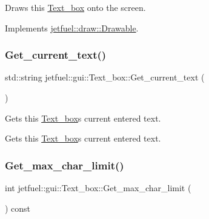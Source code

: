 Draws this \hyperlink{classjetfuel_1_1gui_1_1Text__box}{Text\+\_\+box} onto the screen. 

Implements \hyperlink{classjetfuel_1_1draw_1_1Drawable_a1a072070322965ce9411ee6e7c311c56}{jetfuel\+::draw\+::\+Drawable}.

\mbox{\label{classjetfuel_1_1gui_1_1Text__box_ac68da2c696932b9ac32fb8f463239079}} 
\subsubsection{\texorpdfstring{Get\+\_\+current\+\_\+text()}{Get\_current\_text()}}
{\footnotesize\ttfamily std\+::string jetfuel\+::gui\+::\+Text\+\_\+box\+::\+Get\+\_\+current\+\_\+text (\begin{DoxyParamCaption}{ }\end{DoxyParamCaption})\hspace{0.3cm}{\ttfamily [inline]}}



Gets this \hyperlink{classjetfuel_1_1gui_1_1Text__box}{Text\+\_\+box}\textquotesingle{}s current entered text. 

Gets this \hyperlink{classjetfuel_1_1gui_1_1Text__box}{Text\+\_\+box}\textquotesingle{}s current entered text. \mbox{\label{classjetfuel_1_1gui_1_1Text__box_a5faccdac5b50830ac7425fcd3a0312a8}} 
\subsubsection{\texorpdfstring{Get\+\_\+max\+\_\+char\+\_\+limit()}{Get\_max\_char\_limit()}}
{\footnotesize\ttfamily int jetfuel\+::gui\+::\+Text\+\_\+box\+::\+Get\+\_\+max\+\_\+char\+\_\+limit (\begin{DoxyParamCaption}{ }\end{DoxyParamCaption}) const\hspace{0.3cm}{\ttfamily [inline]}}



